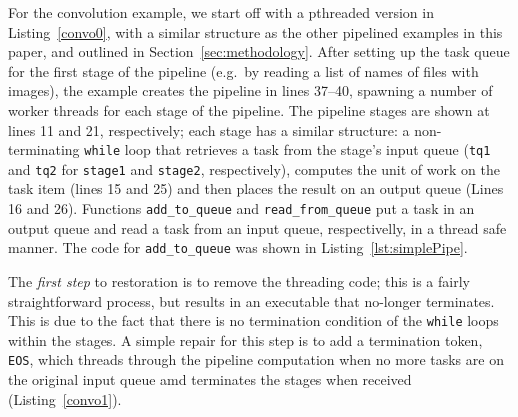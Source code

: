 \noindent
For the convolution example, we start off with a pthreaded version in Listing~\ref{convo0}, with a similar structure as the other pipelined examples in this paper, and outlined in Section~\ref{sec:methodology}. After setting up the task queue for the first stage of the pipeline (e.g.~by reading a list of names of files with images), the example creates the pipeline in lines 37--40, spawning a number of worker threads for each stage of the pipeline. The pipeline stages are shown at lines 11 and 21, respectively; each stage has a similar structure: a non-terminating \lstinline{while} loop that retrieves a task from the stage's input queue (\lstinline{tq1} and \lstinline{tq2} for \lstinline{stage1} and \lstinline{stage2}, respectively), computes the unit of work on the task item (lines 15 and 25) and then places the result on an output queue (Lines 16 and 26). Functions \lstinline{add_to_queue} and \lstinline{read_from_queue} put a task in an output queue and read a task from an input queue, respectivelly, in a thread safe manner. The code for \lstinline{add_to_queue} was shown in Listing~\ref{lst:simplePipe}.

The \emph{first step} to restoration is to remove the threading code; this is a fairly straightforward process, but results in an executable that no-longer terminates. This is due to the fact that there is no termination condition of the \lstinline{while} loops within the stages. A simple repair for this step is to add a termination token, \lstinline{EOS}, which threads through the pipeline computation when no more tasks are on the original input queue amd terminates the stages when received (Listing~\ref{convo1}).

